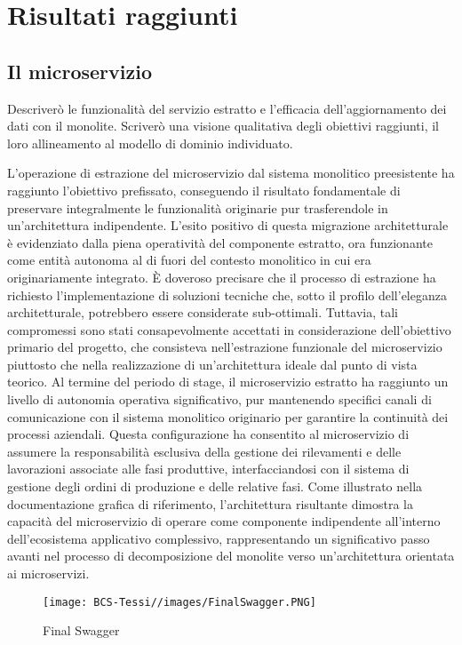     \section{Risultati raggiunti}
        \subsection{Il microservizio}
        Descriverò le funzionalità del servizio estratto e l'efficacia dell'aggiornamento dei dati con il monolite.
        Scriverò una visione qualitativa degli obiettivi raggiunti, il loro allineamento al modello di dominio individuato.

        L'operazione di estrazione del microservizio dal sistema monolitico preesistente ha raggiunto l'obiettivo prefissato, conseguendo il risultato fondamentale di preservare integralmente le funzionalità originarie pur trasferendole in un'architettura indipendente. L'esito positivo di questa migrazione architetturale è evidenziato dalla piena operatività del componente estratto, ora funzionante come entità autonoma al di fuori del contesto monolitico in cui era originariamente integrato.
È doveroso precisare che il processo di estrazione ha richiesto l'implementazione di soluzioni tecniche che, sotto il profilo dell'eleganza architetturale, potrebbero essere considerate sub-ottimali. Tuttavia, tali compromessi sono stati consapevolmente accettati in considerazione dell'obiettivo primario del progetto, che consisteva nell'estrazione funzionale del microservizio piuttosto che nella realizzazione di un'architettura ideale dal punto di vista teorico.
Al termine del periodo di stage, il microservizio estratto ha raggiunto un livello di autonomia operativa significativo, pur mantenendo specifici canali di comunicazione con il sistema monolitico originario per garantire la continuità dei processi aziendali. Questa configurazione ha consentito al microservizio di assumere la responsabilità esclusiva della gestione dei rilevamenti e delle lavorazioni associate alle fasi produttive, interfacciandosi con il sistema di gestione degli ordini di produzione e delle relative fasi.
Come illustrato nella documentazione grafica di riferimento, l'architettura risultante dimostra la capacità del microservizio di operare come componente indipendente all'interno dell'ecosistema applicativo complessivo, rappresentando un significativo passo avanti nel processo di decomposizione del monolite verso un'architettura orientata ai microservizi.

        \begin{figure}[H]
            \centering
            \texttt{[image: BCS-Tessi//images/FinalSwagger.PNG]}
            \caption{Final Swagger}
            \label{fig:final-Swagger}
        \end{figure}
        
